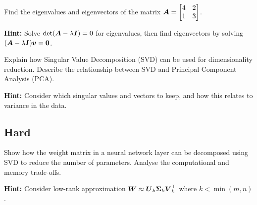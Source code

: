 \begin{problem}
Find the eigenvalues and eigenvectors of the matrix $\boldsymbol{A} = \begin{bmatrix} 4 & 2 \\ 1 & 3 \end{bmatrix}$.

\textbf{Hint:} Solve $\det(\boldsymbol{A} - \lambda \boldsymbol{I}) = 0$ for eigenvalues, then find eigenvectors by solving $(\boldsymbol{A} - \lambda \boldsymbol{I})\boldsymbol{v} = \boldsymbol{0}$.
\end{problem}

\begin{problem}
Explain how Singular Value Decomposition (SVD) can be used for dimensionality reduction. Describe the relationship between SVD and Principal Component Analysis (PCA).

\textbf{Hint:} Consider which singular values and vectors to keep, and how this relates to variance in the data.
\end{problem}

\subsection*{Hard}

\begin{problem}
Show how the weight matrix in a neural network layer can be decomposed using SVD to reduce the number of parameters. Analyse the computational and memory trade-offs.

\textbf{Hint:} Consider low-rank approximation $\boldsymbol{W} \approx \boldsymbol{U}_k \boldsymbol{\Sigma}_k \boldsymbol{V}_k^\top$ where $k < \min(m,n)$.
\end{problem}

